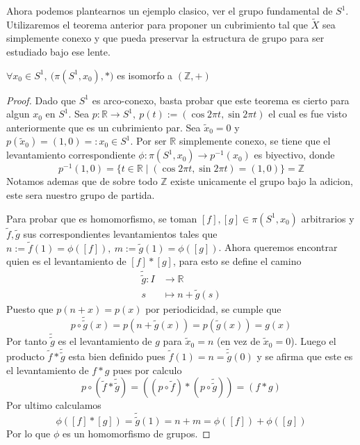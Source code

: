Ahora podemos plantearnos un ejemplo clasico, ver el grupo fundamental
de \(S^1\). Utilizaremos el teorema anterior para proponer un
cubrimiento tal que \(\tilde X\) sea simplemente conexo y que pueda
preservar la estructura de grupo para ser estudiado bajo ese lente.
\begin{teorema}
  \(\forall x_0 \in S^1,\ \big( \pi (S^1,x_0), * \big)\) es isomorfo a
  \((\mathbb Z, +)\)
\end{teorema}
\begin{proof}
  Dado que \(S^1\) es arco-conexo, basta probar que este teorema es
  cierto para algun \(x_0\) en \(S^1\). Sea \(p : \mathbb R \to S^1,\
  p(t) := (\cos 2 \pi t, \sin 2 \pi t)\) el cual es fue visto anteriormente
  que es un cubrimiento par. Sea \(\tilde x _0 = 0\) y \( p(\tilde x _0) =
  (1,0) =: x_0 \in S^1\). Por ser \(\mathbb R\) simplemente conexo, se
  tiene que el levantamiento correspondiente \(\phi : \pi (S^1, x_0) \to
  p^{-1} (x_0)\) es biyectivo, donde
  \[ p^{-1} (1,0) = \{t \in \mathbb R \mid (\cos 2 \pi t, \sin 2 \pi t)
    = (1, 0) \} = \mathbb Z \]
  Notamos ademas que de sobre todo \(\mathbb Z\) existe unicamente el
  grupo bajo la adicion, este sera nuestro grupo de partida.

  Para probar que es homomorfismo, se toman \([f], [g] \in \pi
  (S^1, x_0)\) arbitrarios y \(\tilde f, \tilde g\) sus correspondientes
  levantamientos tales que \(n := \tilde f (1) = \phi ([f]),\ m :=
  \tilde g (1) = \phi ([g])\). Ahora queremos encontrar quien es el
  levantamiento de \([f] * [g]\), para esto se define el camino
  \begin{align*}
    \tilde{\tilde g} : I &\longrightarrow \mathbb R \\
    s &\longmapsto n + \tilde g (s)
  \end{align*}
  Puesto que \(p(n + x) = p(x)\) por periodicidad, se cumple que
  \[ p \circ \tilde{\tilde g} (x) = p (n + \tilde g (x)) = p (\tilde g
    (x)) = g (x) \]
  Por tanto \(\tilde{\tilde g}\) es el levantamiento de \(g\) para
  \(\tilde x_0 = n\) (en vez de \(\tilde x_0 = 0\)). Luego el producto
  \(\tilde f * \tilde{\tilde g}\) esta bien definido pues \(\tilde f (1)
  = n = \tilde{\tilde g} (0)\) y se afirma que este es el levantamiento
  de \(f * g\) pues por calculo
  \[ p \circ (\tilde f * \tilde{\tilde g}) =
     ((p \circ \tilde f) * (p \circ \tilde{\tilde g})) =
     (f * g)
  \]
  Por ultimo calculamos
  \[ \phi ([f] * [g]) = \tilde{\tilde g} (1) = n + m = \phi ([f]) + \phi
  ([g]) \]
  Por lo que \(\phi\) es un homomorfismo de grupos.
\end{proof}

